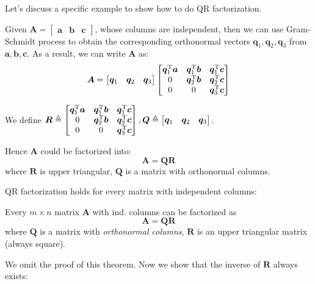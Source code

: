 Let's discuss a specific example to show how to do QR factorization.
\begin{example}
Given $\bm A=\begin{bmatrix}
\bm a&\bm b&\bm c
\end{bmatrix}$, whose columns are independent, then we can use Gram-Schmidt process to obtain the corresponding orthonormal vectors $\bm q_1,\bm q_2,\bm q_3$ from $\bm a,\bm b,\bm c$. As a result,
we can write $\bm A$ as:
\[
\bm A=\begin{bmatrix}
\bm q_1&\bm q_2&\bm q_3
\end{bmatrix}\begin{bmatrix}
\bm q_1^{\mathrm T}\bm a&\bm q_1^{\mathrm T}\bm b&\bm q_1^{\mathrm T}\bm c\\0&\bm q_2^{\mathrm T}\bm b&\bm q_2^{\mathrm T}\bm c\\0&0&\bm q_3^{\mathrm T}\bm c
\end{bmatrix}
\]


We define $\bm R\triangleq\begin{bmatrix}
\bm q_1^{\mathrm T}\bm a&\bm q_1^{\mathrm T}\bm b&\bm q_1^{\mathrm T}\bm c\\0&\bm q_2^{\mathrm T}\bm b&\bm q_2^{\mathrm T}\bm c\\0&0&\bm q_3^{\mathrm T}\bm c
\end{bmatrix}, \bm Q\triangleq\begin{bmatrix}
\bm q_1&\bm q_2&\bm q_3
\end{bmatrix}$.

Hence $\bm A$ could be factorized into:
\[
\bm A=\bm{QR}
\]
where $\bm R$ is upper triangular, $\bm Q$ is a matrix with orthonormal columns.
\end{example}
QR factorization holds for every matrix with independent columns:
\begin{theorem}
Every $m\times n$ matrix $\bm A$ with ind. columns can be factorized as
\[
\bm A=\bm{QR}
\]
where $\bm Q$ is a matrix with \textit{orthonormal columns}, $\bm R$ is an upper triangular matrix (always square).
\end{theorem}
We omit the proof of this theorem. Now we show that the inverse of $\bm R$ always exists:
